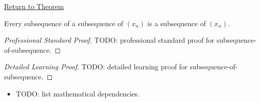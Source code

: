 \newpage
{}
\label{prf:subsequence-of-subsequence}

\begin{remark*}[Return]
\hyperref[thm:subsequence-of-subsequence]{Return to Theorem}
\end{remark*}

\begin{theorem*}
Every subsequence of a subsequence of $(x_n)$ is a subsequence of $(x_n)$.

\smallskip
\noindent
\end{theorem*}

\begin{proof}[Professional Standard Proof]
\LRAProofBodyStart
TODO: professional standard proof for subsequence-of-subsequence.
\end{proof}

\begin{proof}[Detailed Learning Proof]
\LRAProofBodyStart
TODO: detailed learning proof for subsequence-of-subsequence.
\end{proof}

\begin{remark*}
\end{remark*}

\begin{dependencies}
\begin{itemize}
  \item TODO: list mathematical dependencies.
\end{itemize}
\end{dependencies}

\clearpage
